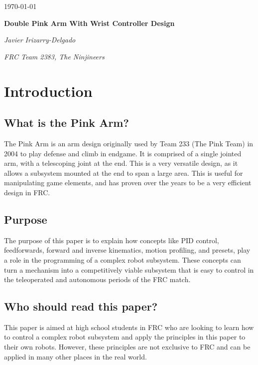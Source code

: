 \documentclass{scrartcl}
\begin{document}
\begin{titlepage}
    \centering
    {\large \today\par}
    \vfill

    {\huge\bfseries Double Pink Arm With Wrist Controller Design\par}
    \vfill

    {\Large\itshape Javier Irizarry-Delgado}\par
    {\itshape FRC Team 2383, The Ninjineers}\par
    \vspace{1.5cm}

    \vfill
\end{titlepage}

\newpage

\doublespacing
\tableofcontents
\singlespacing
\newpage
\doublespacing
\section{Introduction}
\subsection{What is the Pink Arm?}
The Pink Arm is an arm design originally used by Team 233 (The Pink Team) in 2004 to play defense and climb in endgame. It is comprised of a single jointed arm, with a telescoping joint at the end. This is a very versatile design, as it allows a subsystem mounted at the end to span a large area. This is useful for manipulating game elements, and has proven over the years to be a very efficient design in FRC.

\subsection{Purpose}
The purpose of this paper is to explain how concepts like PID control, feedforwards, forward and inverse kinematics, motion profiling, and presets, play a role in the programming of a complex robot subsystem. These concepts can turn a mechanism into a competitively viable subsystem that is easy to control in the teleoperated and autonomous periods of the FRC match.

\subsection{Who should read this paper?}
This paper is aimed at high school students in FRC who are looking to learn how to control a complex robot subsystem and apply the principles in this paper to their own robots. However, these principles are not exclusive to FRC and can be applied in many other places in the real world.
\end{document}
